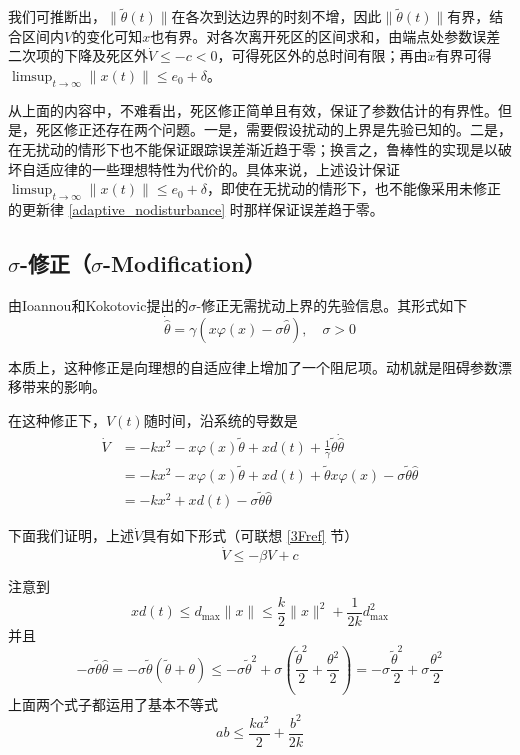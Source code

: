我们可推断出，\(\| \tilde{\theta}(t) \|\)在各次到达边界的时刻不增，因此\(\| \tilde{\theta}(t) \|\)有界，结合区间内$V$的变化可知$x$也有界。对各次离开死区的区间求和，由端点处参数误差二次项的下降及死区外$\dot V\leq-c<0$，可得死区外的总时间有限；再由$\dot x$有界可得$\limsup_{t\to\infty}\|x(t)\|\leq e_0+\delta$。

从上面的内容中，不难看出，死区修正简单且有效，保证了参数估计的有界性。但是，死区修正还存在两个问题。一是，需要假设扰动的上界是先验已知的。二是，在无扰动的情形下也不能保证跟踪误差渐近趋于零；换言之，鲁棒性的实现是以破坏自适应律的一些理想特性为代价的。具体来说，上述设计保证$\limsup_{t\to\infty}\|x(t)\|\leq e_0+\delta$，即使在无扰动的情形下，也不能像采用未修正的更新律 \eqref{adaptive_nodisturbance} 时那样保证误差趋于零。

\subsection{\texorpdfstring{$\sigma$-修正（$\sigma$-Modification）}{σ-修正（σ-Modification）}}
由Ioannou和Kokotovic提出的$\sigma$-修正无需扰动上界的先验信息。其形式如下
\begin{equation} \label{sigma_modification}
    \dot{\hat{\theta}} = \gamma(x\varphi(x) - \sigma\hat{\theta}),\quad \sigma>0
\end{equation}

本质上，这种修正是向理想的自适应律上增加了一个阻尼项。动机就是阻碍参数漂移带来的影响。

在这种修正下，\(V(t)\)随时间，沿系统的导数是
\[\begin{aligned}
\dot{V} & = - kx^{2} - x\varphi(x)\tilde{\theta} + xd(t) + \frac{1}{\gamma}\tilde{\theta}\dot{\hat{\theta}} \\
 & = - kx^{2} - x\varphi(x)\tilde{\theta} + xd(t) + \tilde{\theta}x\varphi(x) - \sigma\tilde{\theta}\hat{\theta} \\
 & = - kx^{2} + xd(t) - \sigma\tilde{\theta}\hat{\theta} 
\end{aligned}\]

下面我们证明，上述$\dot{V}$具有如下形式（可联想 \ref{3Fref} 节）
\[\dot{V} \le - \beta V + c\]

注意到\begin{equation}
    xd(t) \leq d_{\max} \| x \| \leq \frac{k}{2}\| x \|^{2} + \frac{1}{2k}d_{\max}^{2}\label{temp_neq1}
\end{equation}
并且\begin{equation}
    - \sigma\tilde{\theta}\hat{\theta} = - \sigma\tilde{\theta}(\tilde{\theta} + \theta)
    \leq - \sigma{\tilde{\theta}}^{2} + \sigma\left(\frac{{\tilde{\theta}}^{2}}{2} + \frac{\theta^{2}}{2}\right)
    = - \sigma\frac{{\tilde{\theta}}^{2}}{2} + \sigma\frac{\theta^{2}}{2}\label{temp_neq2}
\end{equation}
上面两个式子都运用了基本不等式\[ab \leq \frac{ka^{2}}{2} + \frac{b^{2}}{2k}\]

